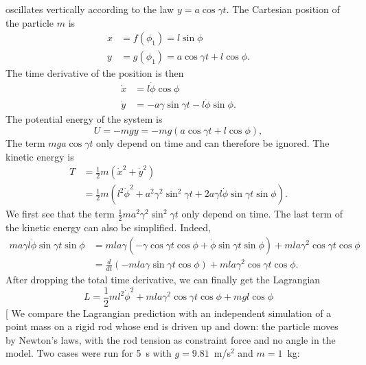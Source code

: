 \begin{subproblem}
{
 oscillates vertically according to the law $y=a\cos{\gamma t}$.
}
{
The Cartesian position of the particle $m$ is
\begin{align*}
    x &= f(\phi_1) = l \sin{\phi} \\
    y &= g(\phi_1) = a \cos{\gamma t} + l \cos{\phi} .
\end{align*}
The time derivative of the position is then
\begin{align*}
    \Dot{x} &= l \Dot{\phi} \cos{\phi} \\
    \Dot{y} &= -a \gamma \sin{\gamma t} - l \Dot{\phi} \sin{\phi} .
\end{align*}
The potential energy of the system is 
\begin{equation*}
    U = -mgy = -mg \left( a \cos{\gamma t} + l \cos{\phi} \right),
\end{equation*}
The term $mga \cos{\gamma t}$ only depend on time and can therefore be ignored. The kinetic energy is
\begin{align*}
    T &= \frac{1}{2} m (\Dot{x}^2 + \Dot{y}^2)\\
    &= \frac{1}{2} m \left(l^2\Dot{\phi}^2 + a^2\gamma^2\sin^2{\gamma t} + 2a\gamma l \Dot{\phi}\sin{\gamma t}\sin{\phi}\right).
\end{align*}
We first see that the term $\frac{1}{2} m a^2\gamma^2\sin^2{\gamma t}$ only depend on time. The last term of the kinetic energy can also be simplified. Indeed, 
\begin{align*}
       m a\gamma l \Dot{\phi}\sin{\gamma t}\sin{\phi} &= 
      m l a \gamma (-\gamma \cos{\gamma t} \cos{\phi} + \Dot{\phi} \sin{\gamma t}\sin{\phi}) + m l a \gamma^2 \cos{\gamma t}\cos{\phi} \\
      &= \frac{d}{dt} \left( -mla\gamma\sin{\gamma t}\cos{\phi} \right) + m l a \gamma^2 \cos{\gamma t}\cos{\phi}.
\end{align*}
After dropping the total time derivative, we can finally get the Lagrangian
}
{
\begin{equation*}
    L = \frac{1}{2} m l^2\Dot{\phi}^2 + m l a \gamma^2 \cos{\gamma t}\cos{\phi}  + mgl\cos{\phi}
\end{equation*}
}
[
We compare the Lagrangian prediction with an independent simulation of a point mass on a rigid rod whose end is driven up and down: the particle moves by Newton's laws, with the rod tension as constraint force and no angle in the model. Two cases were run for 5~s with $g = 9.81$~m/s$^2$ and $m = 1$~kg:
\begin{itemize}

\end{itemize}
\end{subproblem}
